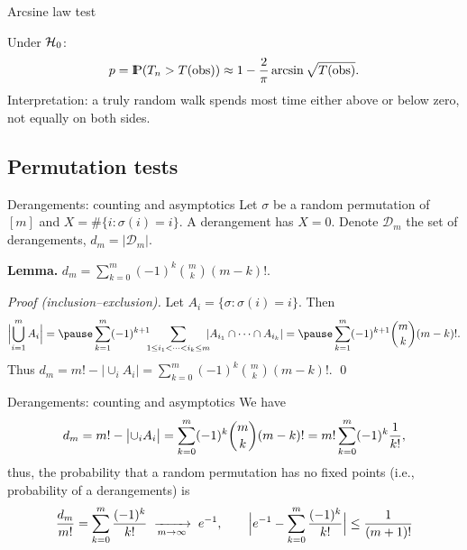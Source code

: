 \documentclass[aspectratio=169]{beamer}
\newcommand{\Prob}{{\rm I\hspace{-0.8mm}P}}
\begin{document}
\begin{frame}{Arcsine law test}


Under ${\cal H}_0$:
\[
p=\Prob(T_n>T(\mathrm{obs}))\approx
1-\frac{2}{\pi}\arcsin\sqrt{T(\mathrm{obs})}.
\]
Interpretation: a truly random walk spends most time either above or below zero, not equally on both sides.
\end{frame}


\subsection{Permutation tests}

\begin{frame}{Derangements: counting and asymptotics}
Let $\sigma$ be a random permutation of $[m]$ and $X=\#\{i:\sigma(i)=i\}$.
A derangement has $X=0$. Denote $\mathcal{D}_m$ the set of derangements, $d_m=|\mathcal{D}_m|$.

\textbf{Lemma.} \; $d_m=\displaystyle\sum_{k=0}^{m}(-1)^k{m\choose k}(m-k)!$.

\textit{Proof (inclusion–exclusion).}
Let $A_i=\{\sigma:\sigma(i)=i\}$. Then
\[
\Bigl|\bigcup_{i=1}^m A_i\Bigr|
= \pause \sum_{k=1}^{m}(-1)^{k+1}\!\!\!\sum_{1\le i_1<\cdots<i_k\le m}\!\!\!|A_{i_1}\cap\cdots\cap A_{i_k}|
= \pause \sum_{k=1}^{m}(-1)^{k+1}{m\choose k}(m-k)!.
\]
Thus $d_m=m!-\bigl|\cup_i A_i\bigr|=\sum_{k=0}^{m}(-1)^k{m\choose k}(m-k)!$. \qed

\end{frame}




\begin{frame}{Derangements: counting and asymptotics}
We have
$$d_m=m!-\bigl|\cup_i A_i\bigr|=\sum_{k=0}^{m}(-1)^k{m\choose k}(m-k)!
=m!\sum_{k=0}^{m}(-1)^k{1\over k!},$$
thus, the probability that a random permutation has no  fixed points
(i.e., probability of a derangements) is
\[
\frac{d_m}{m!}=\sum_{k=0}^{m}\frac{(-1)^k}{k!}\;\xrightarrow[m\to\infty]{}\;e^{-1},\qquad
\Bigl|e^{-1}-\sum_{k=0}^{m}\frac{(-1)^k}{k!}\Bigr|\le \frac{1}{(m+1)!}
\]


\end{frame}

\end{document}
